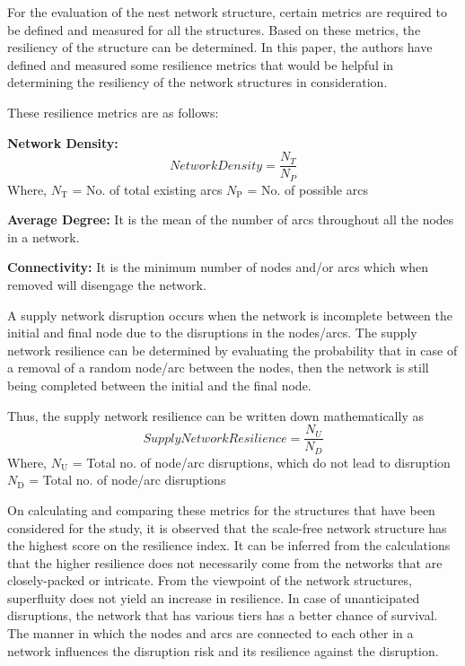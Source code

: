For the evaluation of the nest network structure, certain metrics are required to be defined and measured for all the structures. Based on these metrics, the resiliency of the structure can be determined. In this paper, the authors have defined and measured some resilience metrics that would be helpful in determining the resiliency of the network structures in consideration.

These resilience metrics are as follows:


\textbf{Network Density:}
\begin{equation}
    Network Density = \frac{N_T}{N_P}
\end{equation}
\newline
Where,
\newline
  $N_{\text{T}}$ = No. of total existing arcs
\newline  
 $N_{\text{P}}$ = No. of possible arcs
 

\textbf{Average Degree:} It is the mean of the number of arcs throughout all the nodes in a network.

\textbf{Connectivity:} It is the minimum number of nodes and/or arcs which when removed will disengage the network.

A supply network disruption occurs when the network is incomplete between the initial and final node due to the disruptions in the nodes/arcs. The supply network resilience can be determined by evaluating the probability that in case of a removal of a random node/arc between the nodes, then the network is still being completed between the initial and the final node.


Thus, the supply network resilience can be written down mathematically as
\begin{equation}
    Supply Network Resilience = \frac{N_U}{N_D}
\end{equation}
Where,
\newline
$N_{\text{U}}$ = Total no. of node/arc disruptions, which do not lead to disruption
\newline
$N_{\text{D}}$ = Total no. of node/arc disruptions

On calculating and comparing these metrics for the structures that have been considered for the study, it is observed that the scale-free network structure has the highest score on the resilience index. It can be inferred from the calculations that the higher resilience does not necessarily come from the networks that are closely-packed or intricate. From the viewpoint of the network structures, superfluity does not yield an increase in resilience. In case of unanticipated disruptions, the network that has various tiers has a better chance of survival. The manner in which the nodes and arcs are connected to each other in a network influences the disruption risk and its resilience against the disruption.

